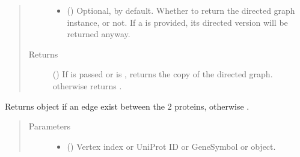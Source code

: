\documentclass[letterpaper,10pt,english]{sphinxmanual}
\begin{document}
\begin{fulllineitems}
\begin{fulllineitems}
\begin{quote}
\begin{description}
\begin{itemize}
\item {} 
 () \textendash{} Optional,  by default. Whether to return the
directed graph instance, or not. If a  is provided,
its directed version will be returned anyway.

\end{itemize}

\item[{Returns}] \leavevmode
() \textendash{} If  is passed or  is
, returns the copy of the directed graph. otherwise
returns .

\end{description}\end{quote}

\end{fulllineitems}


\begin{fulllineitems}
\label{\detokenize{reference:pypath.main.PyPath.get_dirs_signs}}
\end{fulllineitems}


\begin{fulllineitems}
\label{\detokenize{reference:pypath.main.PyPath.get_edge}}
Returns  object if an edge exist between
the 2 proteins, otherwise .
\begin{quote}\begin{description}
\item[{Parameters}] \leavevmode\begin{itemize}
\item {} 
 (\sphinxstyleliteralemphasis{\sphinxupquote{,}}) \textendash{} Vertex index or UniProt ID or GeneSymbol or 
object.


\end{itemize}
\end{description}
\end{quote}
\end{fulllineitems}
\end{fulllineitems}
\end{document}
